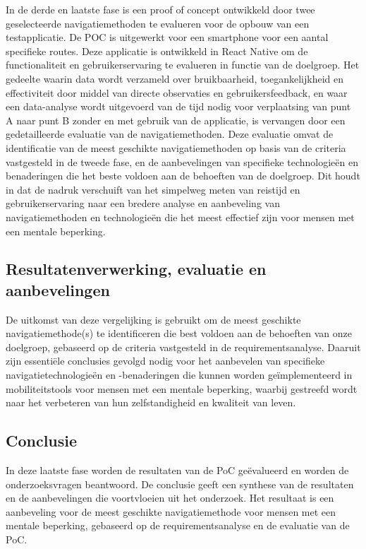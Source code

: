 In de derde en laatste fase is een proof of concept ontwikkeld door twee geselecteerde navigatiemethoden te evalueren voor de opbouw van een testapplicatie. De POC is uitgewerkt voor een smartphone voor een aantal specifieke routes. Deze applicatie is ontwikkeld in React Native om de functionaliteit en gebruikerservaring te evalueren in functie van de doelgroep. Het gedeelte waarin data wordt verzameld over bruikbaarheid, toegankelijkheid en effectiviteit door middel van directe observaties en gebruikersfeedback, en waar een data-analyse wordt uitgevoerd van de tijd nodig voor verplaatsing van punt A naar punt B zonder en met gebruik van de applicatie, is vervangen door een gedetailleerde evaluatie van de navigatiemethoden. Deze evaluatie omvat de identificatie van de meest geschikte navigatiemethoden op basis van de criteria vastgesteld in de tweede fase, en de aanbevelingen van specifieke technologieën en benaderingen die het beste voldoen aan de behoeften van de doelgroep. Dit houdt in dat de nadruk verschuift van het simpelweg meten van reistijd en gebruikerservaring naar een bredere analyse en aanbeveling van navigatiemethoden en technologieën die het meest effectief zijn voor mensen met een mentale beperking.


\subsection*{Resultatenverwerking, evaluatie en aanbevelingen}

De uitkomst van deze vergelijking is gebruikt om de meest geschikte navigatiemethode(s) te identificeren die best voldoen aan de behoeften van onze doelgroep, gebaseerd op de criteria vastgesteld in de requirementsanalyse. Daaruit zijn essentiële conclusies gevolgd nodig voor het aanbevelen van specifieke navigatietechnologieën en -benaderingen die kunnen worden geïmplementeerd in mobiliteitstools voor mensen met een mentale beperking, waarbij gestreefd wordt naar het verbeteren van hun zelfstandigheid en kwaliteit van leven.

\subsection*{Conclusie}

In deze laatste fase worden de resultaten van de PoC geëvalueerd en worden de onderzoeksvragen beantwoord. De conclusie geeft een synthese van de resultaten en de aanbevelingen die voortvloeien uit het onderzoek. Het resultaat is een aanbeveling voor de meest geschikte navigatiemethode voor mensen met een mentale beperking, gebaseerd op de requirementsanalyse en de evaluatie van de PoC.
